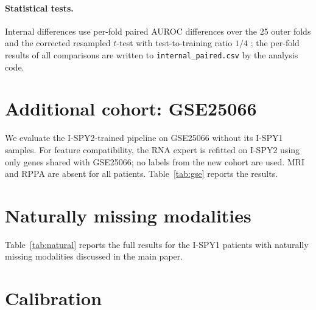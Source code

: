 \documentclass[a4paper,runningheads]{llncs}
\begin{document}
\paragraph{Statistical tests.} Internal differences use per-fold paired AUROC differences over the 25 outer folds and the corrected resampled $t$-test with test-to-training ratio $1/4$ \cite{nadeau2003}; the per-fold results of all comparisons are written to \texttt{internal\_paired.csv} by the analysis code.

\section{Additional cohort: GSE25066}

We evaluate the I-SPY2-trained pipeline on GSE25066 without its I-SPY1 samples. For feature compatibility, the RNA expert is refitted on I-SPY2 using only genes shared with GSE25066; no labels from the new cohort are used. MRI and RPPA are absent for all patients. Table~\ref{tab:gse} reports the results.

\begin{table}[h]
\centering
\caption{GSE25066 without its I-SPY1 samples (\GseN{} patients, \GsePos{} with pCR; RNA refitted on I-SPY2 restricted to the shared genes; MRI and RPPA absent). Swap and dropout: mean of 30 realizations.}
\label{tab:gse}
\small
{}
\end{table}

\section{Naturally missing modalities}

Table~\ref{tab:natural} reports the full results for the I-SPY1 patients with naturally missing modalities discussed in the main paper.

\begin{table}[h]
\centering
\caption{I-SPY1 patients with their true availability masks (columns: subset, number of patients/with pCR). ``all'' contains every patient with at least one optional modality; ``partial'' contains patients with exactly one.}
\label{tab:natural}
\setlength{\tabcolsep}{3pt}
\end{table}

\section{Calibration}
\end{document}
